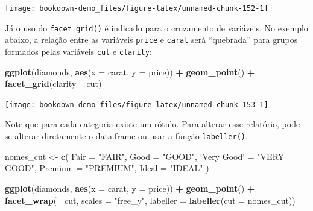 \documentclass[]{book}
\newenvironment{Shaded}{\begin{snugshade}}{\end{snugshade}}
\newcommand{\KeywordTok}[1]{\textcolor[rgb]{0.13,0.29,0.53}{\textbf{#1}}}
\newcommand{\DataTypeTok}[1]{\textcolor[rgb]{0.13,0.29,0.53}{#1}}
\newcommand{\StringTok}[1]{\textcolor[rgb]{0.31,0.60,0.02}{#1}}
\newcommand{\OperatorTok}[1]{\textcolor[rgb]{0.81,0.36,0.00}{\textbf{#1}}}
\newcommand{\NormalTok}[1]{#1}
\begin{document}
\begin{center}\texttt{[image: bookdown-demo\_files/figure-latex/unnamed-chunk-152-1]} \end{center}

Já o uso do \texttt{facet\_grid()} é indicado para o cruzamento de
variáveis. No exemplo abaixo, a relação entre as variáveis
\texttt{price} e \texttt{carat} será ``quebrada'' para grupos formados
pelas variáveis \texttt{cut} e \texttt{clarity}:

\begin{Shaded}
\begin{Highlighting}[]
\KeywordTok{ggplot}\NormalTok{(diamonds, }\KeywordTok{aes}\NormalTok{(}\DataTypeTok{x =}\NormalTok{ carat, }\DataTypeTok{y =}\NormalTok{ price)) }\OperatorTok{+}
\StringTok{  }\KeywordTok{geom_point}\NormalTok{() }\OperatorTok{+}
\StringTok{  }\KeywordTok{facet_grid}\NormalTok{(clarity }\OperatorTok{~}\StringTok{ }\NormalTok{cut)}
\end{Highlighting}
\end{Shaded}

\begin{center}\texttt{[image: bookdown-demo\_files/figure-latex/unnamed-chunk-153-1]} \end{center}

Note que para cada categoria existe um rótulo. Para alterar esse
relatório, pode-se alterar diretamente o data.frame ou usar a função
\texttt{labeller()}.

\begin{Shaded}
\begin{Highlighting}[]
\NormalTok{nomes_cut <-}\StringTok{ }\KeywordTok{c}\NormalTok{(}
  \DataTypeTok{Fair =} \StringTok{"FAIR"}\NormalTok{,}
  \DataTypeTok{Good =} \StringTok{"GOOD"}\NormalTok{,}
  \StringTok{`}\DataTypeTok{Very Good}\StringTok{`}\NormalTok{ =}\StringTok{ "VERY GOOD"}\NormalTok{,}
  \DataTypeTok{Premium =} \StringTok{"PREMIUM"}\NormalTok{,}
  \DataTypeTok{Ideal =} \StringTok{"IDEAL"}
\NormalTok{)}

\KeywordTok{ggplot}\NormalTok{(diamonds, }\KeywordTok{aes}\NormalTok{(}\DataTypeTok{x =}\NormalTok{ carat, }\DataTypeTok{y =}\NormalTok{ price)) }\OperatorTok{+}
\StringTok{  }\KeywordTok{geom_point}\NormalTok{() }\OperatorTok{+}
\StringTok{  }\KeywordTok{facet_wrap}\NormalTok{(}\OperatorTok{~}\StringTok{ }\NormalTok{cut, }\DataTypeTok{scales =} \StringTok{"free_y"}\NormalTok{,}
             \DataTypeTok{labeller =} \KeywordTok{labeller}\NormalTok{(}\DataTypeTok{cut =}\NormalTok{ nomes_cut))}
\end{Highlighting}
\end{Shaded}
\end{document}
